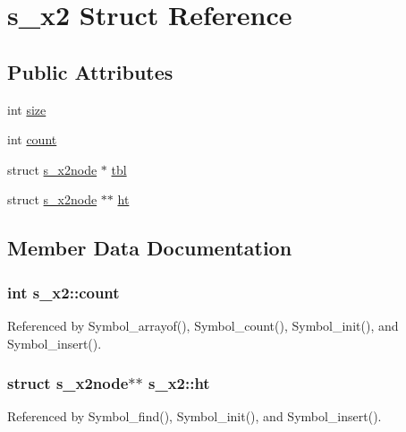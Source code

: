 \hypertarget{structs__x2}{\section{s\-\_\-x2 Struct Reference}
\label{structs__x2}
}
\subsection*{Public Attributes}
\begin{DoxyCompactItemize}
\item 
int \hyperlink{structs__x2_aad2d1ac9e654208ceefdb791d38771b1}{size}
\item 
int \hyperlink{structs__x2_a1767489fb2e9c38a4be6207943962a01}{count}
\item 
struct \hyperlink{structs__x2node}{s\-\_\-x2node} $\ast$ \hyperlink{structs__x2_ac0fdfd5d00199fae703fb916ce512405}{tbl}
\item 
struct \hyperlink{structs__x2node}{s\-\_\-x2node} $\ast$$\ast$ \hyperlink{structs__x2_a73972335e145004c9860cf1fb85b8c0d}{ht}
\end{DoxyCompactItemize}


\subsection{Member Data Documentation}
\hypertarget{structs__x2_a1767489fb2e9c38a4be6207943962a01}{
\subsubsection[{count}]{\setlength{\rightskip}{0pt plus 5cm}int s\-\_\-x2\-::count}}\label{structs__x2_a1767489fb2e9c38a4be6207943962a01}


Referenced by Symbol\-\_\-arrayof(), Symbol\-\_\-count(), Symbol\-\_\-init(), and Symbol\-\_\-insert().

\hypertarget{structs__x2_a73972335e145004c9860cf1fb85b8c0d}{
\subsubsection[{ht}]{\setlength{\rightskip}{0pt plus 5cm}struct {\bf s\-\_\-x2node}$\ast$$\ast$ s\-\_\-x2\-::ht}}\label{structs__x2_a73972335e145004c9860cf1fb85b8c0d}


Referenced by Symbol\-\_\-find(), Symbol\-\_\-init(), and Symbol\-\_\-insert().

